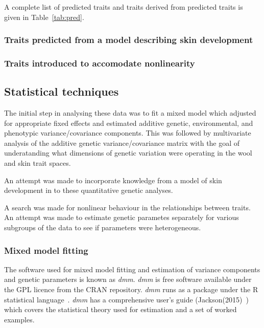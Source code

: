 \documentclass[titlepage]{article}  %
\begin{document}
A complete list of predicted traits and traits derived from predicted traits is given in Table~\ref{tab:pred}.



\subsubsection{Traits predicted from a model describing skin development}

\subsubsection{Traits introduced to accomodate nonlinearity}

\subsection{Statistical techniques}
\label{sect:stats}
The initial step in analysing these data was to fit a mixed model which adjusted for appropriate fixed effects and estimated additive genetic, environmental, and phenotypic variance/covariance components. This was followed by multivariate analysis of the additive genetic variance/covariance matrix with the goal of underatanding what dimensions of genetic variation were operating in the wool and skin trait spaces. 

An attempt was made to incorporate knowledge from a model of skin development in to these quantitative genetic analyses.

A search was made for nonlinear behaviour in the relationships between traits.
An attempt was made to estimate genetic parametes separately for various subgroups of the data to see if parameters were heterogeneous.

\subsubsection{Mixed model fitting}
The software used for mixed model fitting and estimation of variance components and genetic parameters is known as {\em dmm}. {\em dmm} is free software available under the GPL licence from the CRAN repository. {\em dmm} runs as a package under the R statistical language~\cite{rprog:13}. {\em dmm} has a comprehensive user's guide (Jackson(2015)~\cite{jack:15b}) which covers the statistical theory used for estimation and a set of worked examples.
\end{document}
